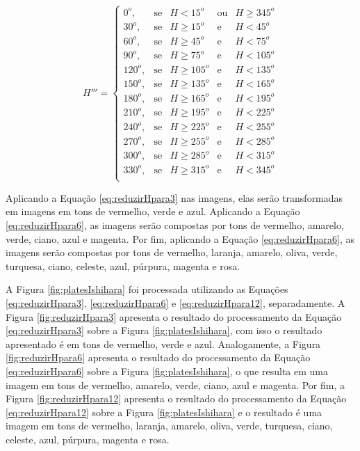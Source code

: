 \documentclass[	12pt, Times, openright, twoside, a4paper, english, brazil]{abntex2}
\begin{document}
\begin{equation}
\label{eq:reduzirHpara12}
H'''=\left\{
\begin{array}{rclcl}
    0^o,    &\mbox{se}  & H <15^o       & \mbox{ou} & H \geq 345^o \\
    30^o,   &\mbox{se}  & H \geq 15^o   & \mbox{e}  & H < 45^o \\
    60^o,   &\mbox{se}  & H \geq 45^o   & \mbox{e}  & H < 75^o \\
    90^o,   &\mbox{se}  & H \geq 75^o   & \mbox{e}  & H < 105^o \\
    120^o,  &\mbox{se}  & H \geq 105^o  & \mbox{e}  & H < 135^o \\
    150^o,  &\mbox{se}  & H \geq 135^o  & \mbox{e}  & H < 165^o \\
    180^o,  &\mbox{se}  & H \geq 165^o  & \mbox{e}  & H < 195^o \\
    210^o,  &\mbox{se}  & H \geq 195^o  & \mbox{e}  & H < 225^o \\
    240^o,  &\mbox{se}  & H \geq 225^o  & \mbox{e}  & H < 255^o \\
    270^o,  &\mbox{se}  & H \geq 255^o  & \mbox{e}  & H < 285^o \\
    300^o,  &\mbox{se}  & H \geq 285^o  & \mbox{e}  & H < 315^o \\
    330^o,  &\mbox{se}  & H \geq 315^o  & \mbox{e}  & H < 345^o \\
\end{array}\right.
\end{equation}

Aplicando a Equação \ref{eq:reduzirHpara3} nas imagens, elas serão transformadas em imagens em tons de vermelho, verde e azul. Aplicando a Equação \ref{eq:reduzirHpara6}, as imagens serão compostas por tons de vermelho, amarelo, verde, ciano, azul e magenta. Por fim, aplicando a Equação \ref{eq:reduzirHpara6}, as imagens serão compostas por tons de vermelho, laranja, amarelo, oliva, verde, turquesa, ciano, celeste, azul, púrpura, magenta e rosa.

A Figura \ref{fig:platesIshihara} foi processada utilizando as Equações \ref{eq:reduzirHpara3}, \ref{eq:reduzirHpara6} e \ref{eq:reduzirHpara12}, separadamente. A Figura \ref{fig:reduzirHpara3} apresenta o resultado do processamento da Equação \ref{eq:reduzirHpara3} sobre a Figura \ref{fig:platesIshihara}, com isso o resultado apresentado é em tons de vermelho, verde e azul. Analogamente, a Figura \ref{fig:reduzirHpara6} apresenta o resultado do processamento da Equação \ref{eq:reduzirHpara6} sobre a Figura \ref{fig:platesIshihara}, o que resulta em uma imagem em tons de vermelho, amarelo, verde, ciano, azul e magenta. Por fim, a Figura \ref{fig:reduzirHpara12} apresenta o resultado do processamento da Equação \ref{eq:reduzirHpara12} sobre a Figura \ref{fig:platesIshihara} e o resultado é uma imagem em tons de vermelho, laranja, amarelo, oliva, verde, turquesa, ciano, celeste, azul, púrpura, magenta e rosa.
\end{document}
